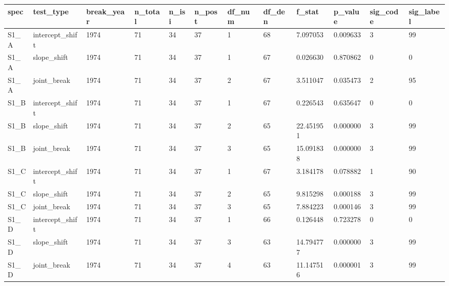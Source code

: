 \begin{tabular}{llllllllllll}
\hline
spec & test\_type & break\_year & n\_total & n\_isi & n\_post & df\_num & df\_den & f\_stat & p\_value & sig\_code & sig\_label \\
\hline
S1\_A & intercept\_shift & 1974 & 71 & 34 & 37 & 1 & 68 & 7.097053 & 0.009633 & 3 & 99 \\
S1\_A & slope\_shift & 1974 & 71 & 34 & 37 & 1 & 67 & 0.026630 & 0.870862 & 0 & 0 \\
S1\_A & joint\_break & 1974 & 71 & 34 & 37 & 2 & 67 & 3.511047 & 0.035473 & 2 & 95 \\
S1\_B & intercept\_shift & 1974 & 71 & 34 & 37 & 1 & 67 & 0.226543 & 0.635647 & 0 & 0 \\
S1\_B & slope\_shift & 1974 & 71 & 34 & 37 & 2 & 65 & 22.451951 & 0.000000 & 3 & 99 \\
S1\_B & joint\_break & 1974 & 71 & 34 & 37 & 3 & 65 & 15.091838 & 0.000000 & 3 & 99 \\
S1\_C & intercept\_shift & 1974 & 71 & 34 & 37 & 1 & 67 & 3.184178 & 0.078882 & 1 & 90 \\
S1\_C & slope\_shift & 1974 & 71 & 34 & 37 & 2 & 65 & 9.815298 & 0.000188 & 3 & 99 \\
S1\_C & joint\_break & 1974 & 71 & 34 & 37 & 3 & 65 & 7.884223 & 0.000146 & 3 & 99 \\
S1\_D & intercept\_shift & 1974 & 71 & 34 & 37 & 1 & 66 & 0.126448 & 0.723278 & 0 & 0 \\
S1\_D & slope\_shift & 1974 & 71 & 34 & 37 & 3 & 63 & 14.794777 & 0.000000 & 3 & 99 \\
S1\_D & joint\_break & 1974 & 71 & 34 & 37 & 4 & 63 & 11.147516 & 0.000001 & 3 & 99 \\
\hline
\end{tabular}

